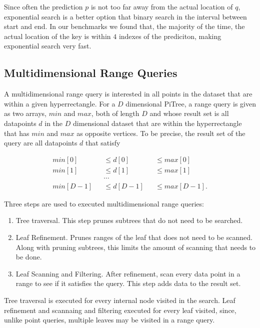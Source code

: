 \documentclass[sigconf,10pt]{acmart}
\begin{document}
Since often the prediction $p$ is not too far away from the actual location
of $q$, exponential search is a better option that binary search in the interval
between start and end. %
In our benchmarks we found that, the majority of the time,
the actual location of the key is within $4$ indexes of the prediciton,
making exponential search very fast. 


\subsection{Multidimensional Range Queries}

A multidimensional range query is interested in all points in the 
dataset that are within a given hyperrectangle. For a $D$ dimensional PiTree,
a range query is given as two arrays, $min$ and $max$, both of length $D$
and whose result set is all datapoints $d$ in the $D$ dimensional dataset 
that are within the hyperrectangle that has $min$ and $max$ as opposite vertices.
To be precise, the result set of the query are all datapoints $d$
that satisfy

\begin{align*}
  min[0] && \leq d[0] && \leq max[0] \\
  min[1] && \leq d[1] && \leq max[1] \\
  && \cdots && \\
  min[D-1] && \leq d[D-1] && \leq max[D-1].
\end{align*}

Three steps are used to executed multidimensional range queries:
\begin{enumerate}
  \item Tree traversal. This step prunes subtrees that do not need to be searched.
  \item Leaf Refinement. Prunes ranges of the leaf that does not need to be scanned.
  Along with pruning subtrees, this limits the amount of scanning that needs to be done.
  \item Leaf Scanning and Filtering. After refinement, scan every data point in
  a range to see if it satisfies the query. This step adds 
  data to the result set.
\end{enumerate}

Tree traversal is executed for every internal node visited in the search.
Leaf refinement and scannaing and filtering executed for every leaf visited, since, unlike
point queries, multiple leaves may be visited in a range query.
\end{document}
